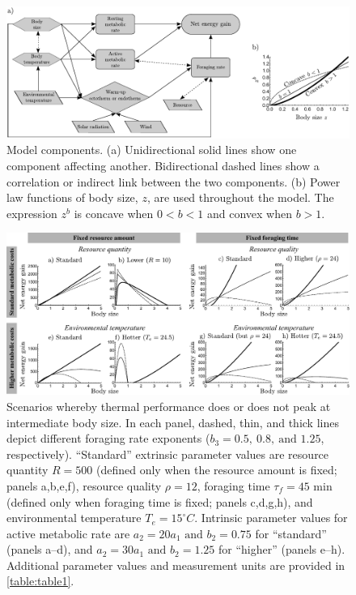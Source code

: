 \clearpage

\begin{figure}
\includegraphics[width=\textwidth]{fig1}
\caption{
    \setstretch{\stretchby}
    Model components.
    (a) Unidirectional solid lines show one component affecting another.
    Bidirectional dashed lines show a correlation or indirect link between the two components.
    (b) Power law functions of body size, $z$, are used throughout the model.
    The expression $z^b$ is concave when $0 < b < 1$ and convex when $b > 1$.
}
\label{fig1}
\end{figure}

\clearpage

\begin{figure}
\includegraphics[width=\textwidth]{fig2}
\caption{
    \setstretch{\stretchby}
    Scenarios whereby thermal performance does or does not peak at intermediate body size.
    In each panel, dashed, thin, and thick lines depict different foraging rate exponents ($b_3 = 0.5,\ 0.8,\ \text{and } 1.25$, respectively).
    ``Standard'' extrinsic parameter values are 
    resource quantity $R = 500$ (defined only when the resource amount is fixed; panels a,b,e,f),
    resource quality $\rho = 12$,
    foraging time $\tau_f = 45 \text{ min}$ (defined only when foraging time is fixed; panels c,d,g,h), 
    and environmental temperature $T_e = 15^\circ C$.
    Intrinsic parameter values for active metabolic rate are $a_2 = 20 a_1 \text{ and } b_2 = 0.75$ for ``standard'' (panels a--d), and $a_2 = 30 a_1 \text{ and } b_2  = 1.25$ for ``higher'' (panels e--h).
    Additional parameter values and measurement units are provided in \cref{table:table1}.
}
\label{fig2}
\end{figure}

